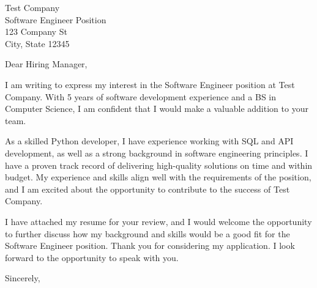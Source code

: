 \documentclass{letter}
\begin{document}
\begin{letter}{Test Company \\ Software Engineer Position \\ 123 Company St \\ City, State 12345}

\opening{Dear Hiring Manager,}

I am writing to express my interest in the Software Engineer position at Test Company. With 5 years of software development experience and a BS in Computer Science, I am confident that I would make a valuable addition to your team.

As a skilled Python developer, I have experience working with SQL and API development, as well as a strong background in software engineering principles. I have a proven track record of delivering high-quality solutions on time and within budget. My experience and skills align well with the requirements of the position, and I am excited about the opportunity to contribute to the success of Test Company.

I have attached my resume for your review, and I would welcome the opportunity to further discuss how my background and skills would be a good fit for the Software Engineer position. Thank you for considering my application. I look forward to the opportunity to speak with you.

\closing{Sincerely,}

\end{letter}
\end{document}
